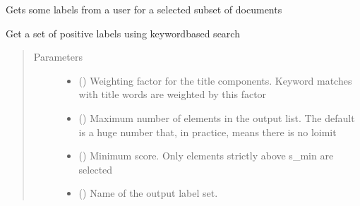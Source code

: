 \documentclass[letterpaper,10pt,english]{sphinxmanual}
\begin{document}
\begin{fulllineitems}
\begin{fulllineitems}
\label{\detokenize{dc_task_manager:src.task_manager.TaskManager.get_feedback}}
\sphinxAtStartPar
Gets some labels from a user for a selected subset of documents

\end{fulllineitems}


\begin{fulllineitems}
\label{\detokenize{dc_task_manager:src.task_manager.TaskManager.get_labels_by_keywords}}
\sphinxAtStartPar
Get a set of positive labels using keyword\sphinxhyphen{}based search
\begin{quote}\begin{description}
\item[{Parameters}] \leavevmode\begin{itemize}
\item {} 
\sphinxAtStartPar
{} () \textendash{} Weighting factor for the title components. Keyword matches with
title words are weighted by this factor

\item {} 
\sphinxAtStartPar
{} () \textendash{} Maximum number of elements in the output list. The default is
a huge number that, in practice, means there is no loimit

\item {} 
\sphinxAtStartPar
{} () \textendash{} Minimum score. Only elements strictly above s\_min are selected

\item {} 
\sphinxAtStartPar
{} () \textendash{} Name of the output label set.


\end{itemize}
\end{description}
\end{quote}
\end{fulllineitems}
\end{fulllineitems}
\end{document}
